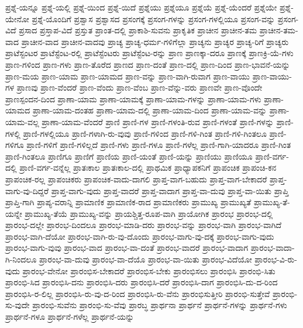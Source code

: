 {ಪ್ರಶ್ನೆ-ಯನ್ನೂ
ಪ್ರಶ್ನೆ-ಯಲ್ಲಿ
ಪ್ರಶ್ನೆ-ಯಿಂದ
ಪ್ರಶ್ನೆ-ಯಿದೆ
ಪ್ರಶ್ನೆಯು
ಪ್ರಶ್ನೆಯೂ
ಪ್ರಶ್ನೆಯೆ
ಪ್ರಶ್ನೆ-ಯೆಂದರೆ
ಪ್ರಶ್ನೆಯೇ
ಪ್ರಶ್ನೆ-ಯೇನೋ
ಪ್ರಶ್ನೆ-ಯೊಂದಿಗೆ
ಪ್ರಶ್ವಾಸ
ಪ್ರಶ್ವಾಸದ
ಪ್ರಸಂಗಕ್ಕೆ
ಪ್ರಸಂಗ-ಗಳನ್ನು
ಪ್ರಸಂಗ-ಗಳಲ್ಲಿಯೂ
ಪ್ರಸಂಗ-ವನ್ನು
ಪ್ರಸಂಗ-ವಿದೆ
ಪ್ರಸಾದ
ಪ್ರಸ್ತಾಪ-ವಿದೆ
ಪ್ರಸ್ತುತ
ಪ್ರಾಂತ-ದಲ್ಲಿ
ಪ್ರಾಕಾಶಿ-ಸುವನು
ಪ್ರಾಕೃತಿಕ
ಪ್ರಾಚೀನ
ಪ್ರಾಚೀನ-ತಮ
ಪ್ರಾಚೀನ-ತಮ-ವಾದ
ಪ್ರಾಚೀನ-ವಾದ
ಪ್ರಾಚೀನ-ವಾದವು
ಪ್ರಾಚ್ಯ
ಪ್ರಾಚ್ಯ-ಧರ್ಮ-ಗಳಿಗೆಲ್ಲಾ
ಪ್ರಾಚ್ಯನು
ಪ್ರಾಚ್ಯರ
ಪ್ರಾಚ್ಯ-ರಿಗೆ
ಪ್ರಾಚ್ಯರು
ಪ್ರಾಟೆಸ್ಟಂಟರ
ಪ್ರಾಟೆಸ್ಟೆಂಟ-ರಲ್ಲಿ
ಪ್ರಾಟೆಸ್ಟೆಂಟರು
ಪ್ರಾಟೆಸ್ಟೆಂಟ-ರನ್ನು
ಪ್ರಾಣ
ಪ್ರಾಣಕ್ಕಾ-ದರೂ
ಪ್ರಾಣಕ್ಕೆ
ಪ್ರಾಣಕ್ರಿ-ಯೆ-ಗಳು
ಪ್ರಾಣ-ಗಳಿಂದ
ಪ್ರಾಣ-ಗಳು
ಪ್ರಾಣ-ತೊರೆದ
ಪ್ರಾಣದ
ಪ್ರಾಣ-ದಂತೆ
ಪ್ರಾಣ-ದಲ್ಲಿ
ಪ್ರಾಣ-ದಿಂದ
ಪ್ರಾಣ-ಭಾವನೆ-ಯನ್ನು
ಪ್ರಾಣ-ಮಯ
ಪ್ರಾಣ-ಯಾಮ
ಪ್ರಾಣ-ಯಾಮದ
ಪ್ರಾಣ-ವನ್ನು
ಪ್ರಾಣ-ವಾಗಿ-ರುವಾಗ
ಪ್ರಾಣ-ವಾಯು
ಪ್ರಾಣ-ವಾಯು-ಗಳ
ಪ್ರಾಣವು
ಪ್ರಾಣ-ವೆಂದರೆ
ಪ್ರಾಣ-ವೆಂದು
ಪ್ರಾಣ-ವೆಂಬ
ಪ್ರಾಣ-ವೆನ್ನು-ವರು
ಪ್ರಾಣವೇ
ಪ್ರಾಣ-ವೊಂದೇ
ಪ್ರಾಣಸ್ಪಂದನ-ದಿಂದ
ಪ್ರಾಣಾ-ಯಾಮ
ಪ್ರಾಣಾ-ಯಾಮಕ್ಕೆ
ಪ್ರಾಣಾ-ಯಾಮ-ಗಳನ್ನು
ಪ್ರಾಣಾ-ಯಾಮ-ಗಳು
ಪ್ರಾಣಾ-ಯಾಮದ
ಪ್ರಾಣಾ-ಯಾಮ-ದಂತಹ
ಪ್ರಾಣಾ-ಯಾಮ-ದಲ್ಲಿ
ಪ್ರಾಣಾ-ಯಾಮ-ದಿಂದ
ಪ್ರಾಣಾ-ಯಾಮ-ವನ್ನು
ಪ್ರಾಣಾ-ಯಾಮ-ವಲ್ಲ
ಪ್ರಾಣಾ-ಯಾಮ-ವೆಂದರೆ
ಪ್ರಾಣಿ
ಪ್ರಾಣಿ-ಗಳ
ಪ್ರಾಣಿ-ಗಳಂತಿ-ರುವ
ಪ್ರಾಣಿ-ಗಳಂತೆ
ಪ್ರಾಣಿ-ಗಳನ್ನು
ಪ್ರಾಣಿ-ಗಳಲ್ಲಿ
ಪ್ರಾಣಿ-ಗಳಲ್ಲಿಯೂ
ಪ್ರಾಣಿ-ಗಳಾಗಿ-ರು-ವುವು
ಪ್ರಾಣಿ-ಗಳಿಂದ
ಪ್ರಾಣಿ-ಗಳಿ-ಗಿಂತ
ಪ್ರಾಣಿ-ಗಳಿ-ಗಿಂತಲೂ
ಪ್ರಾಣಿ-ಗಳಿಗೂ
ಪ್ರಾಣಿ-ಗಳಿಗೆ
ಪ್ರಾಣಿ-ಗಳಿಲ್ಲದೆ
ಪ್ರಾಣಿ-ಗಳು
ಪ್ರಾಣಿ-ಗಳೂ
ಪ್ರಾಣಿ-ಗಳೆಲ್ಲ
ಪ್ರಾಣಿ-ಗಾಗಿ-ಯಾದರೂ
ಪ್ರಾಣಿ-ಗಿಂತ
ಪ್ರಾಣಿ-ಗಿಂತಲೂ
ಪ್ರಾಣಿಗೂ
ಪ್ರಾಣಿಗೆ
ಪ್ರಾಣಿಯ
ಪ್ರಾಣಿ-ಯಂತೆ
ಪ್ರಾಣಿ-ಯನ್ನು
ಪ್ರಾಣಿಯು
ಪ್ರಾಣಿಯೂ
ಪ್ರಾಣಿ-ವರ್ಗ-ದಲ್ಲಿ
ಪ್ರಾಣಿ-ವರ್ಗ-ವನ್ನೆಲ್ಲ
ಪ್ರಾತಃಕಾಲ
ಪ್ರಾತಃಕಾಲ-ದಲ್ಲಿ
ಪ್ರಾಥಮಿಕ
ಪ್ರಾಧ್ಯಾಪಕನಿಗೆ
ಪ್ರಾಪಂಚಿಕ
ಪ್ರಾಪಂಚಿ-ಕನ
ಪ್ರಾಪಂಚಿಕ-ರಲ್ಲ
ಪ್ರಾಪಂಚಿಕರು
ಪ್ರಾಪಂಚಿಕ-ವಾದು-ದಾಗಲಿ
ಪ್ರಾಪ್ತ-ವಾಗ-ಬಹುದು
ಪ್ರಾಪ್ತ-ವಾಗ-ಬೇಕಾದರೆ
ಪ್ರಾಪ್ತ-ವಾಗು-ವು-ದಿದ್ದರೆ
ಪ್ರಾಪ್ತ-ವಾಗು-ವುದು
ಪ್ರಾಪ್ತ-ವಾದರೆ
ಪ್ರಾಪ್ತ-ವಾದಾಗ
ಪ್ರಾಪ್ತ-ವಾ-ದುವು
ಪ್ರಾಪ್ತ-ವಾ-ಯಿತು
ಪ್ರಾಪ್ತಿ
ಪ್ರಾಪ್ತಿ-ಗಾಗಿ
ಪ್ರಾಪ್ಯ-ವರಾನ್ನಿ
ಪ್ರಾಮಾಣಿಕ
ಪ್ರಾಮಾಣಿಕ-ರಾದ
ಪ್ರಾಮಾಣಿಕರು
ಪ್ರಾಮುಖ್ಯ
ಪ್ರಾಮುಖ್ಯತೆ
ಪ್ರಾಮುಖ್ಯ-ತೆ-ಯನ್ನೇ
ಪ್ರಾಮುಖ್ಯ-ತೆಯೆ
ಪ್ರಾಮುಖ್ಯ-ವನ್ನು
ಪ್ರಾಯಶ್ಚಿತ್ತ-ರೂಪ-ವಾಗಿ
ಪ್ರಾಯೋಗಿಕ
ಪ್ರಾರಂಭ
ಪ್ರಾರಂಭ-ದಲ್ಲಿ
ಪ್ರಾರಂಭ-ದಲ್ಲೇ
ಪ್ರಾರಂಭ-ದಿಂದಲೂ
ಪ್ರಾರಂಭ-ಮಾಡಿ-ದರು
ಪ್ರಾರಂಭ-ವನ್ನು
ಪ್ರಾರಂಭ-ವಾಗಿ
ಪ್ರಾರಂಭ-ವಾಗಿದೆ
ಪ್ರಾರಂಭ-ವಾಗಿ-ದೆಯೋ
ಪ್ರಾರಂಭ-ವಾಗಿ-ರು-ವು-ದೊಂದು
ಪ್ರಾರಂಭ-ವಾಗು-ವು-ದಕ್ಕೆ
ಪ್ರಾರಂಭ-ವಾಗು-ವುದು
ಪ್ರಾರಂಭ-ವಾಗು-ವುವು
ಪ್ರಾರಂಭ-ವಾದ
ಪ್ರಾರಂಭ-ವಾ-ದಂತೆ
ಪ್ರಾರಂಭ-ವಾದರೆ
ಪ್ರಾರಂಭ-ವಾದಾಗ
ಪ್ರಾರಂಭ-ವಾದಾ-ಗಿ-ನಿಂದಲೂ
ಪ್ರಾರಂಭ-ವಾ-ದುವು
ಪ್ರಾರಂಭ-ವಾ-ದೆಯೊ
ಪ್ರಾರಂಭ-ವಾ-ಯಿತು
ಪ್ರಾರಂಭ-ವಿದೆಯೋ
ಪ್ರಾರಂಭ-ವಿ-ರು-ವುದು
ಪ್ರಾರಂಭ-ವೇನೋ
ಪ್ರಾರಂಭಿಸ-ಬೇಕಾದರೆ
ಪ್ರಾರಂಭಿಸ-ಬೇಕು
ಪ್ರಾರಂಭಿಸಲು
ಪ್ರಾರಂಭಿಸಿ
ಪ್ರಾರಂಭಿ-ಸಿತು
ಪ್ರಾರಂಭಿ-ಸಿದ
ಪ್ರಾರಂಭಿಸಿ-ದನು
ಪ್ರಾರಂಭಿಸಿ-ದರು
ಪ್ರಾರಂಭಿಸಿ-ದರೆ
ಪ್ರಾರಂಭಿಸಿ-ದಾಗ
ಪ್ರಾರಂಭಿಸಿ-ದು-ದ-ರಿಂದ
ಪ್ರಾರಂಭಿಸಿ-ರ-ಲಿಲ್ಲ
ಪ್ರಾರಂಭಿಸಿ-ರು-ವು-ದ-ರಿಂದ
ಪ್ರಾರಂಭಿಸಿ-ರು-ವೆನು
ಪ್ರಾರಂಭಿಸುತ್ತೀರಿ
ಪ್ರಾರಂಭಿ-ಸುತ್ತೇವೆ
ಪ್ರಾರಂಭಿ-ಸು-ವುದೇ
ಪ್ರಾರಂಭಿ-ಸುವೆನು
ಪ್ರಾರಂಭಿ-ಸು-ವೆವು
ಪ್ರಾರಬ್ಧ
ಪ್ರಾರ್ಥನಾ
ಪ್ರಾರ್ಥನೆ
ಪ್ರಾರ್ಥನೆ-ಗಳನ್ನು
ಪ್ರಾರ್ಥನೆ-ಗಳು
ಪ್ರಾರ್ಥನೆ-ಗಳೂ
ಪ್ರಾರ್ಥನೆ-ಗಳೆಲ್ಲ
ಪ್ರಾರ್ಥನೆ-ಯನ್ನು
}
